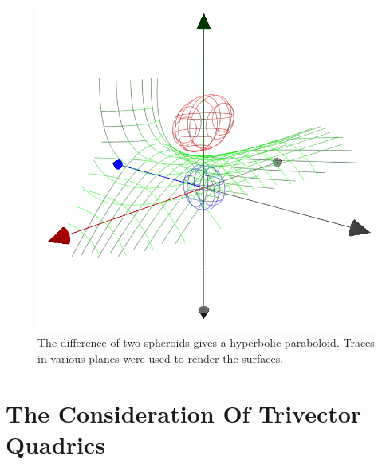 \documentclass[12pt]{article}
\numberwithin{equation}{section}
\begin{document}
\begin{figure}
\includegraphics[scale=0.7]{DiffOfSpheroids}
\caption{The difference of two spheroids gives a hyperbolic paraboloid.  Traces in various planes were used to render the surfaces.}
\label{fig_diff_of_spheroids}
\end{figure}

\section{The Consideration Of Trivector Quadrics}
\end{document}
